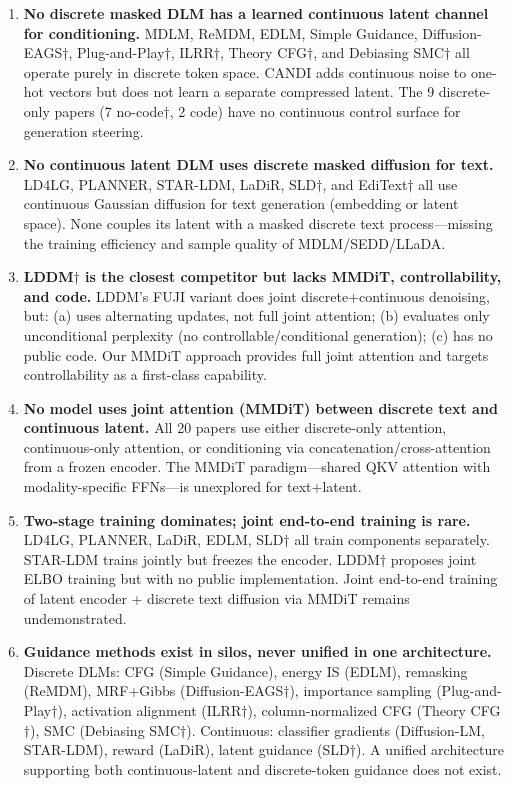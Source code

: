 \documentclass{article}
\begin{document}
\begin{enumerate}[label=\textbf{M\arabic*.}, leftmargin=2em]
    \item \textbf{No discrete masked DLM has a learned continuous latent channel for conditioning.}
    MDLM, ReMDM, EDLM, Simple Guidance, Diffusion-EAGS$\dagger$, Plug-and-Play$\dagger$, ILRR$\dagger$, Theory CFG$\dagger$, and Debiasing SMC$\dagger$ all operate purely in discrete token space. CANDI adds continuous noise to one-hot vectors but does not learn a separate compressed latent. The 9 discrete-only papers (7 no-code$\dagger$, 2 code) have no continuous control surface for generation steering.

    \item \textbf{No continuous latent DLM uses discrete masked diffusion for text.}
    LD4LG, PLANNER, STAR-LDM, LaDiR, SLD$\dagger$, and EdiText$\dagger$ all use continuous Gaussian diffusion for text generation (embedding or latent space). None couples its latent with a masked discrete text process---missing the training efficiency and sample quality of MDLM/SEDD/LLaDA.

    \item \textbf{LDDM$\dagger$ is the closest competitor but lacks MMDiT, controllability, and code.}
    LDDM's FUJI variant does joint discrete+continuous denoising, but: (a) uses alternating updates, not full joint attention; (b) evaluates only unconditional perplexity (no controllable/conditional generation); (c) has no public code. Our MMDiT approach provides full joint attention and targets controllability as a first-class capability.

    \item \textbf{No model uses joint attention (MMDiT) between discrete text and continuous latent.}
    All 20 papers use either discrete-only attention, continuous-only attention, or conditioning via concatenation/cross-attention from a frozen encoder. The MMDiT paradigm---shared QKV attention with modality-specific FFNs---is unexplored for text+latent.

    \item \textbf{Two-stage training dominates; joint end-to-end training is rare.}
    LD4LG, PLANNER, LaDiR, EDLM, SLD$\dagger$ all train components separately. STAR-LDM trains jointly but freezes the encoder. LDDM$\dagger$ proposes joint ELBO training but with no public implementation. Joint end-to-end training of latent encoder + discrete text diffusion via MMDiT remains undemonstrated.

    \item \textbf{Guidance methods exist in silos, never unified in one architecture.}
    Discrete DLMs: CFG (Simple Guidance), energy IS (EDLM), remasking (ReMDM), MRF+Gibbs (Diffusion-EAGS$\dagger$), importance sampling (Plug-and-Play$\dagger$), activation alignment (ILRR$\dagger$), column-normalized CFG (Theory CFG$\dagger$), SMC (Debiasing SMC$\dagger$). Continuous: classifier gradients (Diffusion-LM, STAR-LDM), reward (LaDiR), latent guidance (SLD$\dagger$). A unified architecture supporting both continuous-latent and discrete-token guidance does not exist.
\end{enumerate}
\end{document}
